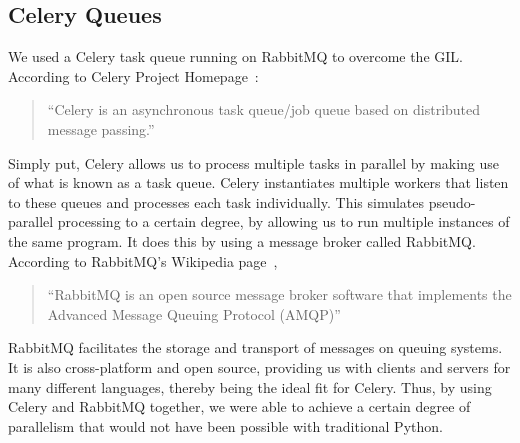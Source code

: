 \subsection{Celery Queues}
\label{exp:Celery}
We used a Celery task queue running on RabbitMQ to overcome the GIL. According to Celery Project Homepage~\cite{Celery}:
\begin{quotation}
``Celery is an asynchronous task queue/job queue based on distributed message passing.''
\end{quotation}

Simply put, Celery allows us to process multiple tasks in parallel by making use of what is known as a task queue. Celery instantiates multiple workers that listen to these queues and processes each task individually. This simulates pseudo-parallel processing to a certain degree, by allowing us to run multiple instances of the same program. It does this by using a message broker called RabbitMQ.
According to RabbitMQ's Wikipedia page~\cite{wiki:RabbitMQ},
\begin{quotation}
``RabbitMQ is an open source message broker software that implements the Advanced Message Queuing Protocol (AMQP)''
\end{quotation}
RabbitMQ facilitates the storage and transport of messages on queuing systems. It is also cross-platform and open source, providing us with clients and servers for many different languages, thereby being the ideal fit for Celery.
Thus, by using Celery and RabbitMQ together, we were able to achieve a certain degree of parallelism that would not have been possible with traditional Python.

